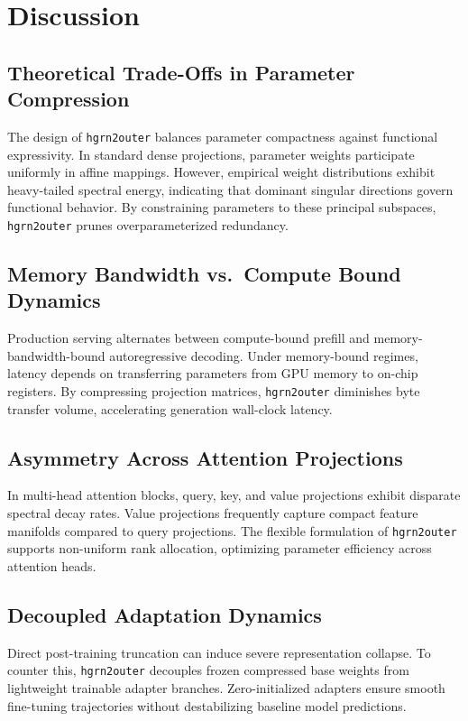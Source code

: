 \section{Discussion}

\subsection{Theoretical Trade-Offs in Parameter Compression}
The design of \texttt{hgrn2outer} balances parameter compactness against functional expressivity. In standard dense projections, parameter weights participate uniformly in affine mappings. However, empirical weight distributions exhibit heavy-tailed spectral energy, indicating that dominant singular directions govern functional behavior. By constraining parameters to these principal subspaces, \texttt{hgrn2outer} prunes overparameterized redundancy.

\subsection{Memory Bandwidth vs.\ Compute Bound Dynamics}
Production serving alternates between compute-bound prefill and memory-bandwidth-bound autoregressive decoding. Under memory-bound regimes, latency depends on transferring parameters from GPU memory to on-chip registers. By compressing projection matrices, \texttt{hgrn2outer} diminishes byte transfer volume, accelerating generation wall-clock latency.

\subsection{Asymmetry Across Attention Projections}
In multi-head attention blocks, query, key, and value projections exhibit disparate spectral decay rates. Value projections frequently capture compact feature manifolds compared to query projections. The flexible formulation of \texttt{hgrn2outer} supports non-uniform rank allocation, optimizing parameter efficiency across attention heads.

\subsection{Decoupled Adaptation Dynamics}
Direct post-training truncation can induce severe representation collapse. To counter this, \texttt{hgrn2outer} decouples frozen compressed base weights from lightweight trainable adapter branches. Zero-initialized adapters ensure smooth fine-tuning trajectories without destabilizing baseline model predictions.

